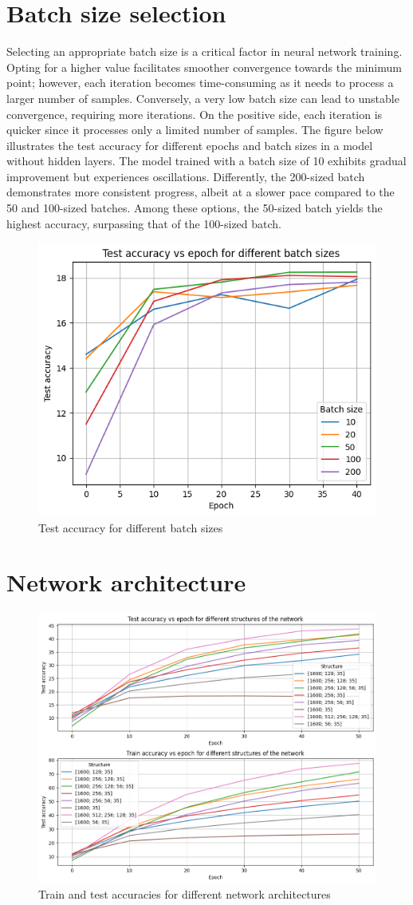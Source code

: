 \documentclass[eng]{class}
\begin{document}
\section{Batch size selection}
Selecting an appropriate batch size is a critical factor in neural network training.
Opting for a higher value facilitates smoother convergence towards the minimum point;
however, each iteration becomes time-consuming as it needs to process a larger number of samples.
Conversely, a very low batch size can lead to unstable convergence, requiring more iterations.
On the positive side, each iteration is quicker since it processes only a limited number of samples.\newline
The figure below illustrates the test accuracy for different epochs and batch sizes in a model without hidden layers.
The model trained with a batch size of 10 exhibits gradual improvement but experiences oscillations.
Differently, the 200-sized batch demonstrates more consistent progress, albeit at a slower pace compared to the 50 and 100-sized batches.
Among these options, the 50-sized batch yields the highest accuracy, surpassing that of the 100-sized batch.
\begin{figure}[h]
  \centering
  \includegraphics[width=.6\columnwidth]{images/batch_size.png}
  \caption{Test accuracy for different batch sizes}
  \label{fig-2}
\end{figure}
\section{Network architecture}
\pagestyle{OtherPage}

\begin{figure}[h]
  \centering
  \includegraphics[width=.6\columnwidth]{images/diff_structures.png}
  \caption{Train and test accuracies for different network architectures}
  \label{fig-3}
\end{figure}
\end{document}
